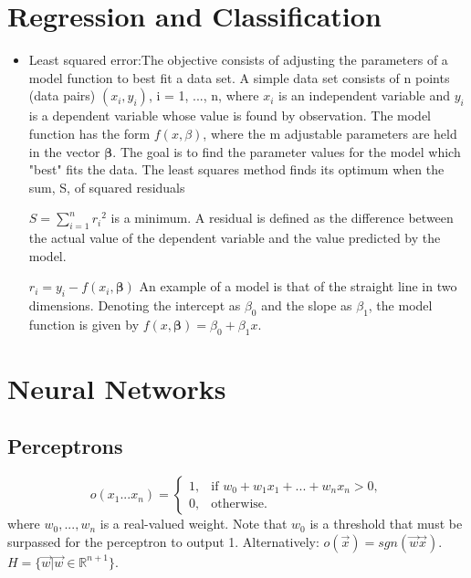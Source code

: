 \documentclass[11pt]{article}
\begin{document}
\section{Regression and Classification}
\begin{itemize}
\item Least squared error:The objective consists of adjusting the parameters of a model function to best fit a data set. A simple data set consists of n points (data pairs) $(x_i,y_i)$, i = 1, ..., n, where $x_i$ is an independent variable and $y_i$ is a dependent variable whose value is found by observation. The model function has the form $f(x,\beta)$, where the m adjustable parameters are held in the vector $\boldsymbol \beta$. The goal is to find the parameter values for the model which "best" fits the data. The least squares method finds its optimum when the sum, S, of squared residuals

$S=\sum_{i=1}^{n}{r_i}^2$
is a minimum. A residual is defined as the difference between the actual value of the dependent variable and the value predicted by the model.

$r_i=y_i-f(x_i,\boldsymbol \beta)$
An example of a model is that of the straight line in two dimensions. Denoting the intercept as $\beta_0$ and the slope as $\beta_1$, the model function is given by $f(x,\boldsymbol \beta)=\beta_0+\beta_1 x$.
\end{itemize}

\section{Neural Networks}
\subsection{Perceptrons}
$$o(x_1...x_n) =
    \begin{cases}
            1, &         \text{if } w_0+w_1x_1+...+w_nx_n>0,\\
            0, &         \text{otherwise}.
    \end{cases}
$$
where $w_0,...,w_n$ is a real-valued weight. Note that $w_0$ is a threshold that must be surpassed for the perceptron to output 1. Alternatively: $o(\vec{x}) = sgn(\vec{w}\vec{x})$. $H =\{\vec{w} | \vec{w} \in \mathbb{R}^{n+1} \}$.
\end{document}
